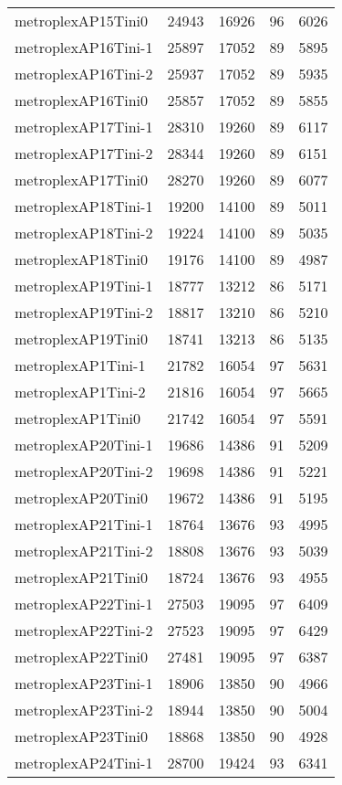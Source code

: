 \begin{longtable}{lrrrr}
metroplexAP15Tini0 & 24943 & 16926 & 96 & 6026 \\
metroplexAP16Tini-1 & 25897 & 17052 & 89 & 5895 \\
metroplexAP16Tini-2 & 25937 & 17052 & 89 & 5935 \\
metroplexAP16Tini0 & 25857 & 17052 & 89 & 5855 \\
metroplexAP17Tini-1 & 28310 & 19260 & 89 & 6117 \\
metroplexAP17Tini-2 & 28344 & 19260 & 89 & 6151 \\
metroplexAP17Tini0 & 28270 & 19260 & 89 & 6077 \\
metroplexAP18Tini-1 & 19200 & 14100 & 89 & 5011 \\
metroplexAP18Tini-2 & 19224 & 14100 & 89 & 5035 \\
metroplexAP18Tini0 & 19176 & 14100 & 89 & 4987 \\
metroplexAP19Tini-1 & 18777 & 13212 & 86 & 5171 \\
metroplexAP19Tini-2 & 18817 & 13210 & 86 & 5210 \\
metroplexAP19Tini0 & 18741 & 13213 & 86 & 5135 \\
metroplexAP1Tini-1 & 21782 & 16054 & 97 & 5631 \\
metroplexAP1Tini-2 & 21816 & 16054 & 97 & 5665 \\
metroplexAP1Tini0 & 21742 & 16054 & 97 & 5591 \\
metroplexAP20Tini-1 & 19686 & 14386 & 91 & 5209 \\
metroplexAP20Tini-2 & 19698 & 14386 & 91 & 5221 \\
metroplexAP20Tini0 & 19672 & 14386 & 91 & 5195 \\
metroplexAP21Tini-1 & 18764 & 13676 & 93 & 4995 \\
metroplexAP21Tini-2 & 18808 & 13676 & 93 & 5039 \\
metroplexAP21Tini0 & 18724 & 13676 & 93 & 4955 \\
metroplexAP22Tini-1 & 27503 & 19095 & 97 & 6409 \\
metroplexAP22Tini-2 & 27523 & 19095 & 97 & 6429 \\
metroplexAP22Tini0 & 27481 & 19095 & 97 & 6387 \\
metroplexAP23Tini-1 & 18906 & 13850 & 90 & 4966 \\
metroplexAP23Tini-2 & 18944 & 13850 & 90 & 5004 \\
metroplexAP23Tini0 & 18868 & 13850 & 90 & 4928 \\
metroplexAP24Tini-1 & 28700 & 19424 & 93 & 6341 \\

\end{longtable}
